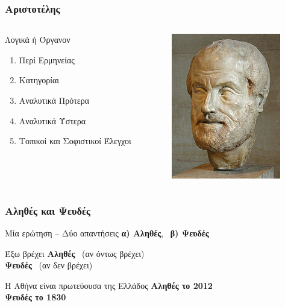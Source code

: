 \begin{frame}[t, fragile]
\frametitle{Αριστοτέλης}
  \begin{columns}[T]
    \begin{column}{0.6\textwidth}
      \begin{block}{Λογικά ή Όργανον}
        \begin{enumerate}
          \item Περί Ερμηνείας
          \item Κατηγορίαι
          \item Αναλυτικά Πρότερα
          \item Αναλυτικά Ύστερα
          \item Τοπικοί και Σοφιστικοί Έλεγχοι         
        \end{enumerate}
      \end{block}
    \end{column}
    \begin{column}{0.4\textwidth}
      \includegraphics[scale=0.7]{Aristoteles.jpg}
    \end{column}
  \end{columns}
\end{frame}


\begin{frame}[t, fragile]
\frametitle{Αληθές και Ψευδές}
\begin{minipage}{\wE}
  \begin{block}{Μία ερώτηση -- Δύο απαντήσεις}
    {\bf\color{green!50!black} α) Αληθές}, \, {\bf\color{red} β) Ψευδές}
  \end{block}
  \pause
  \begin{exampleblock}{Έξω βρέχει}
     {\bf\color{green!50!black} Αληθές} \, (αν όντως βρέχει) \\
     {\bf\color{red} Ψευδές} \, (αν δεν βρέχει) \\     
  \end{exampleblock}
  \pause
  \begin{exampleblock}{Η Αθήνα είναι πρωτεύουσα της Ελλάδος}
     {\bf\color{green!50!black} Αληθές το 2012} \\
     {\bf\color{red} Ψευδές το 1830} \\     
  \end{exampleblock}
\end{minipage}  
\end{frame}



